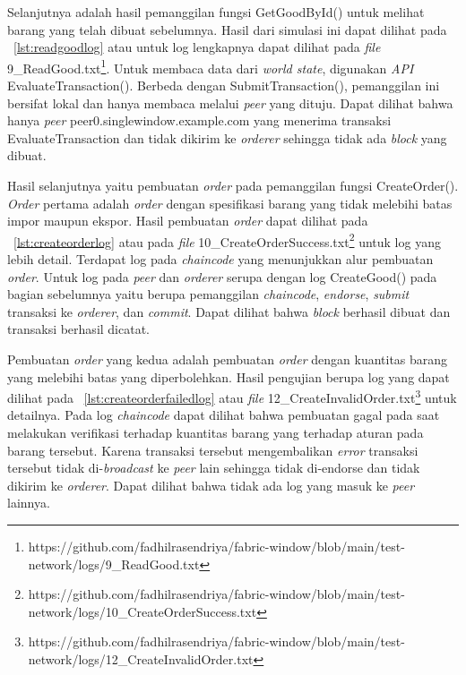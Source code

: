 Selanjutnya adalah hasil pemanggilan fungsi GetGoodById() untuk melihat barang yang telah dibuat sebelumnya. Hasil dari simulasi ini dapat dilihat pada \lst~\ref{lst:readgoodlog} atau untuk log lengkapnya dapat dilihat pada \textit{file} 9\_ReadGood.txt\footnote{https://github.com/fadhilrasendriya/fabric-window/blob/main/test-network/logs/9\_ReadGood.txt}. Untuk membaca data dari \textit{world state}, digunakan \textit{API} EvaluateTransaction(). Berbeda dengan SubmitTransaction(), pemanggilan ini bersifat lokal dan hanya membaca melalui \textit{peer} yang dituju. Dapat dilihat bahwa hanya \textit{peer} peer0.singlewindow.example.com yang menerima transaksi EvaluateTransaction dan tidak dikirim ke \textit{orderer} sehingga tidak ada \textit{block} yang dibuat.



Hasil selanjutnya yaitu pembuatan \textit{order} pada pemanggilan fungsi CreateOrder(). \textit{Order} pertama adalah \textit{order} dengan spesifikasi barang yang tidak melebihi batas impor maupun ekspor. Hasil pembuatan \textit{order} dapat dilihat pada \lst~\ref{lst:createorderlog} atau pada \textit{file} 10\_CreateOrderSuccess.txt\footnote{https://github.com/fadhilrasendriya/fabric-window/blob/main/test-network/logs/10\_CreateOrderSuccess.txt} untuk log yang lebih detail. Terdapat log pada \textit{chaincode} yang menunjukkan alur pembuatan \textit{order}. Untuk log pada \textit{peer} dan \textit{orderer} serupa dengan log CreateGood() pada bagian sebelumnya yaitu berupa pemanggilan \textit{chaincode}, \textit{endorse}, \textit{submit} transaksi ke \textit{orderer}, dan \textit{commit}. Dapat dilihat bahwa \textit{block} berhasil dibuat dan transaksi berhasil dicatat.



Pembuatan \textit{order} yang kedua adalah pembuatan \textit{order} dengan kuantitas barang yang melebihi batas yang diperbolehkan. Hasil pengujian berupa log yang dapat dilihat pada \lst~\ref{lst:createorderfailedlog} atau \textit{file} 12\_CreateInvalidOrder.txt\footnote{https://github.com/fadhilrasendriya/fabric-window/blob/main/test-network/logs/12\_CreateInvalidOrder.txt} untuk detailnya. Pada log \textit{chaincode} dapat dilihat bahwa pembuatan gagal pada saat melakukan verifikasi terhadap kuantitas barang yang terhadap aturan pada barang tersebut. Karena transaksi tersebut mengembalikan \textit{error} transaksi tersebut tidak di-\textit{broadcast} ke \textit{peer} lain sehingga tidak di-endorse dan tidak dikirim ke \textit{orderer}. Dapat dilihat bahwa tidak ada log yang masuk ke \textit{peer} lainnya.

